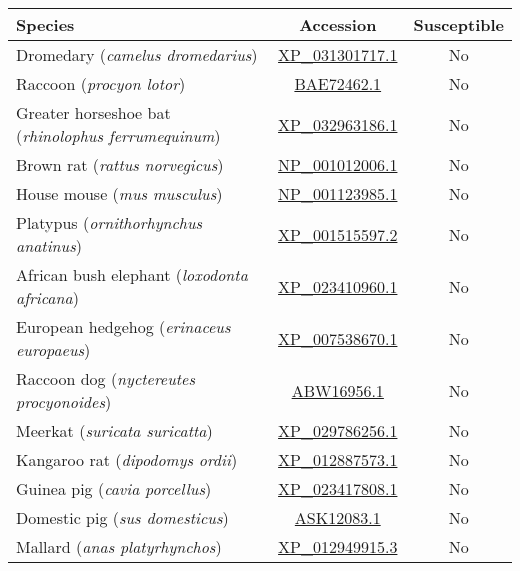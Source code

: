 \newcommand{\spec}[5]{#1 (\emph{#2}) & \href{https://www.ncbi.nlm.nih.gov/protein/#3}{#3} & #4 #5 }

\newcommand{\cA}{\cite{Luan2020}}
\newcommand{\cB}{\cite{Zhao2020}}
\newcommand{\cC}{\cite{Leroy2020}}
\newcommand{\cD}{\cite{Richard2020}}
\newcommand{\cE}{\cite{OudeMunnink2021}}
\newcommand{\cF}{\cite{Palmer2021}}
\newcommand{\cG}{\cite{Chan2020}}
\newcommand{\cH}{\cite{OIE2022}}
\newcommand{\cI}{\cite{Sreenivasan2020}}
\newcommand{\cJ}{\cite{Shi2020}}
\newcommand{\cK}{\cite{Lu2020}}
\newcommand{\cL}{\cite{Woolsey2020}}
\newcommand{\cM}{\cite{Schlottau2020}}

\enlargethispage{2em}
\begin{table}[ht!]
    \begin{adjustwidth}{-12em}{-12em}
    \centering
    \begin{tabular}{lcc}
        \hline
        \textbf{Species} & \textbf{Accession} & \textbf{Susceptible} \\
        \hline
        \spec{Dromedary}{camelus dromedarius}{XP_031301717.1}{No}{\cA} \\
        \spec{Raccoon}{procyon lotor}{BAE72462.1}{No}{\cA} \\
        \spec{Greater horseshoe bat}{rhinolophus ferrumequinum}{XP_032963186.1}{No}{\cA} \\
        \spec{Brown rat}{rattus norvegicus}{NP_001012006.1}{No}{\cA\cB} \\
        \spec{House mouse}{mus musculus}{NP_001123985.1}{No}{\cA\cB} \\
        \spec{Platypus}{ornithorhynchus anatinus}{XP_001515597.2}{No}{\cA} \\
        \spec{African bush elephant}{loxodonta africana}{XP_023410960.1}{No}{\cA} \\
        \spec{European hedgehog}{erinaceus europaeus}{XP_007538670.1}{No}{\cA} \\
        \spec{Raccoon dog}{nyctereutes procyonoides}{ABW16956.1}{No}{\cA} \\
        \spec{Meerkat}{suricata suricatta}{XP_029786256.1}{No}{\cA} \\
        \spec{Kangaroo rat}{dipodomys ordii}{XP_012887573.1}{No}{\cA} \\
        \spec{Guinea pig}{cavia porcellus}{XP_023417808.1}{No}{\cA} \\
        \spec{Domestic pig}{sus domesticus}{ASK12083.1}{No}{\cI\cJ} \\
        \spec{Mallard}{anas platyrhynchos}{XP_012949915.3}{No}{\cI\cJ} \\

\end{tabular}
\end{adjustwidth}
\end{table}
